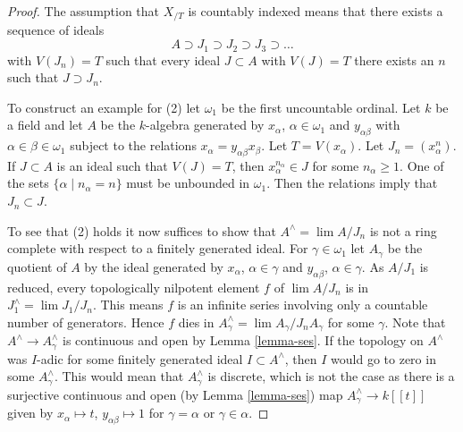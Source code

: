 \documentclass{stacks-project}
\theoremstyle{plain}
\theoremstyle{definition}
\theoremstyle{remark}
\numberwithin{equation}{subsection}
\def\lim{\mathop{\mathrm{lim}}\nolimits}
\begin{document}
\begin{proof}
The assumption that $X_{/T}$ is countably indexed means that there exists a
sequence of ideals
$$
A \supset J_1 \supset J_2 \supset J_3 \supset \ldots
$$
with $V(J_n) = T$ such that every ideal $J \subset A$ with $V(J) = T$
there exists an $n$ such that $J \supset J_n$.

\medskip\noindent
To construct an example for (2) let $\omega_1$ be the first uncountable
ordinal. Let $k$ be a field and let
$A$ be the $k$-algebra generated by $x_\alpha$, $\alpha \in \omega_1$
and $y_{\alpha \beta}$ with $\alpha \in \beta \in \omega_1$
subject to the relations $x_\alpha = y_{\alpha \beta} x_\beta$.
Let $T = V(x_\alpha)$. Let $J_n = (x_\alpha^n)$.
If $J \subset A$ is an ideal such that
$V(J) = T$, then $x_\alpha^{n_\alpha} \in J$ for some $n_\alpha \geq 1$.
One of the sets $\{\alpha \mid n_\alpha = n\}$ must be unbounded in
$\omega_1$. Then the relations imply that $J_n \subset J$.

\medskip\noindent
To see that (2) holds it now suffices to show that $A^\wedge = \lim A/J_n$
is not a ring complete with respect to a finitely generated ideal.
For $\gamma \in \omega_1$ let $A_\gamma$ be the quotient of $A$
by the ideal generated by $x_\alpha$, $\alpha \in \gamma$ and
$y_{\alpha \beta}$, $\alpha \in \gamma$. As $A/J_1$ is reduced,
every topologically nilpotent element $f$ of $\lim A/J_n$ is in
$J_1^\wedge = \lim J_1/J_n$. This means $f$ is an infinite series
involving only a countable number of generators. Hence $f$ dies in
$A_\gamma^\wedge = \lim A_\gamma/J_nA_\gamma$ for some $\gamma$.
Note that $A^\wedge \to A_\gamma^\wedge$ is continuous and open by
Lemma \ref{lemma-ses}.
If the topology on $A^\wedge$ was $I$-adic for some finitely generated ideal
$I \subset A^\wedge$, then $I$ would go to zero in some
$A_\gamma^\wedge$. This would mean that $A_\gamma^\wedge$ is discrete,
which is not the case as there is a surjective continuous and open
(by Lemma \ref{lemma-ses}) map
$A_\gamma^\wedge \to k[[t]]$ given by
$x_\alpha \mapsto t$, $y_{\alpha \beta} \mapsto 1$ for
$\gamma = \alpha$ or $\gamma \in \alpha$.


\end{proof}
\end{document}
